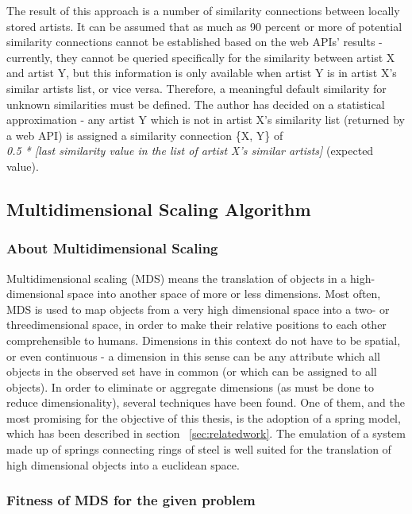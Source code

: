 The result of this approach is a number of similarity connections between locally stored artists. It can be assumed
that as much as 90 percent or more of potential similarity connections cannot be established based on the web APIs'
results - currently, they cannot be queried specifically for the similarity between artist X and artist Y, but 
this information is only available when artist Y is in artist X's similar artists list, or vice versa.
Therefore, a meaningful default similarity for unknown similarities must be defined. The author has decided on a
statistical approximation - any artist Y which is not in artist X's similarity list (returned by a web API) is 
assigned a similarity connection \{X, Y\} of \\
\emph{0.5 * [last similarity value in the list of artist X's similar artists]} (expected value).

\subsection{Multidimensional Scaling Algorithm}

\subsubsection{About Multidimensional Scaling}

Multidimensional scaling (MDS) means the translation of objects in a high-dimensional space into another space of more or less dimensions. Most often, MDS is used to map objects from a very high dimensional space into a two- or threedimensional space, in order to make their relative positions to each other comprehensible to humans. 
Dimensions in this context do not have to be spatial, or even continuous - a dimension in this sense can be any attribute which all objects in the observed set have in common (or which can be assigned to all objects).
In order to eliminate or aggregate dimensions (as must be done to reduce dimensionality), several techniques have been found.
One of them, and the most promising for the objective of this thesis, is the adoption of a spring model, which has been described in section ~\ref{sec:relatedwork}. The emulation of a system made up of springs connecting rings of steel is well suited for the translation of high dimensional objects into a euclidean space.

\subsubsection{Fitness of MDS for the given problem}

